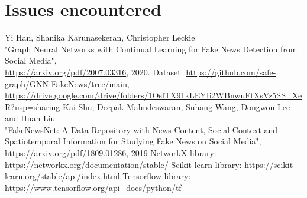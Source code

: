 \documentclass[11pt,a4paper]{article}
\begin{document}
\begin{figure}[h]
    \centering
\end{figure}

\section*{Issues encountered}

\newpage

\begin{thebibliography}{9}
	 Yi Han, Shanika Karunasekeran, Christopher Leckie\\"Graph Neural Networks with Continual Learning for Fake News Detection from Social Media",\\ \url{https://arxiv.org/pdf/2007.03316}, 2020.
	 Dataset: \url{https://github.com/safe-graph/GNN-FakeNews/tree/main},\\\url{https://drive.google.com/drive/folders/1OslTX91kLEYIi2WBnwuFtXsVz5SS_XeR?usp=sharing}
	 Kai Shu, Deepak Mahudeswaran, Suhang Wang, Dongwon Lee and Huan Liu\\"FakeNewsNet: A Data Repository with News Content, Social Context and Spatiotemporal Information for Studying Fake News on Social Media",\\ \url{https://arxiv.org/pdf/1809.01286}, 2019
	 NetworkX library: \url{https://networkx.org/documentation/stable/}
	 Scikit-learn library: \url{https://scikit-learn.org/stable/api/index.html}
	 Tensorflow library: \url{https://www.tensorflow.org/api_docs/python/tf}
\end{thebibliography}

\newpage
\end{document}
